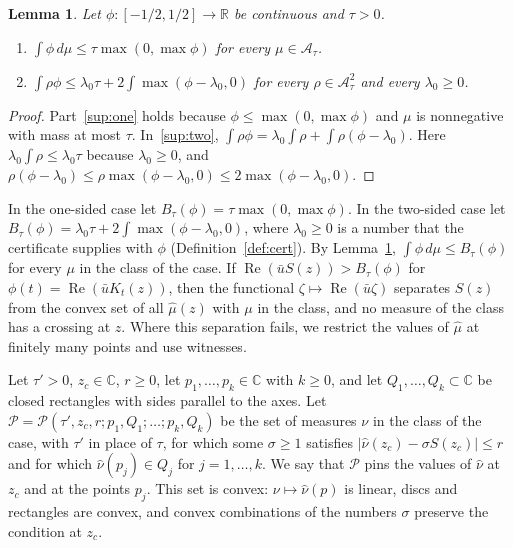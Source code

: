 \documentclass[11pt]{amsart}
\newtheorem{lemma}[theorem]{Lemma}
\theoremstyle{definition}
\theoremstyle{remark}
\numberwithin{equation}{section}
\newcommand{\R}{\mathbb{R}}
\newcommand{\C}{\mathbb{C}}
\newcommand{\re}{\operatorname{Re}}
\begin{document}
\begin{lemma}\label{lem:support}
Let $\phi\colon[-1/2,1/2]\to\R$ be continuous and $\tau>0$.
\begin{enumerate}[label=(\alph*)]
\item\label{sup:one} $\int\phi\,d\mu\le\tau\max(0,\max\phi)$ for every $\mu\in\mathcal A_\tau$.
\item\label{sup:two} $\int\rho\phi\le\lambda_0\tau+2\int\max(\phi-\lambda_0,0)$ for every $\rho\in\mathcal A^2_\tau$ and every $\lambda_0\ge0$.
\end{enumerate}
\end{lemma}

\begin{proof}
Part~\ref{sup:one} holds because $\phi\le\max(0,\max\phi)$ and $\mu$ is nonnegative with mass at most $\tau$. In~\ref{sup:two}, $\int\rho\phi=\lambda_0\int\rho+\int\rho(\phi-\lambda_0)$. Here $\lambda_0\int\rho\le\lambda_0\tau$ because $\lambda_0\ge0$, and $\rho(\phi-\lambda_0)\le\rho\max(\phi-\lambda_0,0)\le2\max(\phi-\lambda_0,0)$.
\end{proof}

In the one-sided case let $B_\tau(\phi)=\tau\max(0,\max\phi)$. In the two-sided case let $B_\tau(\phi)=\lambda_0\tau+2\int\max(\phi-\lambda_0,0)$, where $\lambda_0\ge0$ is a number that the certificate supplies with $\phi$ (Definition~\ref{def:cert}). By Lemma~\ref{lem:support}, $\int\phi\,d\mu\le B_\tau(\phi)$ for every $\mu$ in the class of the case. If $\re(\bar uS(z))>B_\tau(\phi)$ for $\phi(t)=\re(\bar uK_t(z))$, then the functional $\zeta\mapsto\re(\bar u\zeta)$ separates $S(z)$ from the convex set of all $\hat\mu(z)$ with $\mu$ in the class, and no measure of the class has a crossing at $z$. Where this separation fails, we restrict the values of $\hat\mu$ at finitely many points and use witnesses.

Let $\tau'>0$, $z_c\in\C$, $r\ge0$, let $p_1,\dots,p_k\in\C$ with $k\ge0$, and let $Q_1,\dots,Q_k\subset\C$ be closed rectangles with sides parallel to the axes. Let $\mathcal P=\mathcal P(\tau',z_c,r;p_1,Q_1;\dots;p_k,Q_k)$ be the set of measures $\nu$ in the class of the case, with $\tau'$ in place of $\tau$, for which some $\sigma\ge1$ satisfies $|\hat\nu(z_c)-\sigma S(z_c)|\le r$ and for which $\hat\nu(p_j)\in Q_j$ for $j=1,\dots,k$. We say that $\mathcal P$ pins the values of $\hat\nu$ at $z_c$ and at the points $p_j$. This set is convex: $\nu\mapsto\hat\nu(p)$ is linear, discs and rectangles are convex, and convex combinations of the numbers $\sigma$ preserve the condition at $z_c$.
\end{document}
